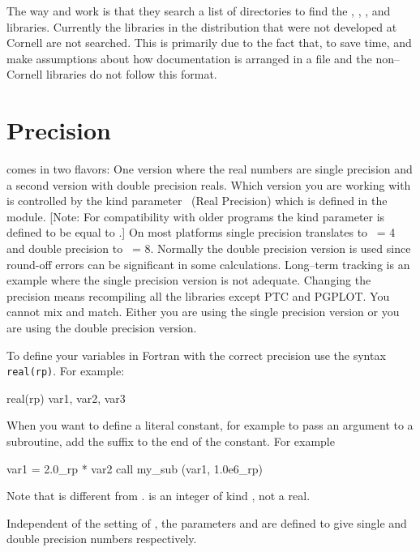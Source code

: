 The way  and  work is that they search a list of
directories to find the , , , and 
libraries. Currently the libraries in the \bmad distribution that were
not developed at Cornell are not searched. This is primarily due to
the fact that, to save time,  and  make assumptions
about how documentation is arranged in a file and the non--Cornell libraries 
do not follow this format.

\section{Precision}
\label{s:precision}

\bmad comes in two flavors: One version where the real numbers are single
precision and a second version with double precision reals. Which
version you are working with is controlled by the kind parameter \
(Real Precision) which is defined in the 
module. [Note: For compatibility with older programs the kind parameter
\vn{rdef} is defined to be equal to .]  On most platforms single
precision translates to \vn{rp}\ = 4 and double precision to \vn{rp}\ =
8. Normally the double precision version is used since round-off
errors can be significant in some calculations. Long--term tracking is
an example where the single precision version is not adequate. Changing 
the precision means recompiling all the libraries except PTC and PGPLOT. 
You cannot mix and match. Either you are using the single precision version
or you are using the double precision version.

To define your variables in Fortran with the correct precision use the syntax
{\tt real(rp)}. For example:
\begin{example}
    real(rp) var1, var2, var3
\end{example}
When you want to define a literal constant, for example to pass an
argument to a subroutine, add the suffix \vn{_rp} to the end of the
constant. For example
\begin{example}
   var1 =  2.0_rp * var2
   call my_sub (var1, 1.0e6_rp)
\end{example}
Note that  is different from .  is an
integer of kind \vn{rp}, not a real.

Independent of the setting of , the parameters  and
\vn{dp} are defined to give single and double precision numbers
respectively.

